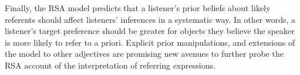 \documentclass[10pt,letterpaper]{article}
\begin{document}
Finally, the RSA model predicts that a listener's prior beliefs about likely referents should affect listeners' inferences in a systematic way. In other words, a listener's target preference should be greater for objects they believe the speaker is more likely to refer to a priori. Explicit prior manipulations, and extensions of the model to other adjectives are promising new avenues to further probe the RSA account of the interpretation of referring expressions. 



































\end{document}
